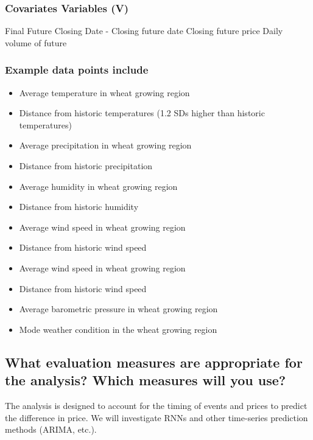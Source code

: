 \documentclass[twoside,11pt]{article}
\begin{document}
\subsubsection{Covariates Variables (V)}

Final Future Closing Date - Closing future date
Closing future price
Daily volume of future

\subsubsection{Example data points include}
\begin{itemize}
  \item Average temperature in wheat growing region 
  \item Distance from historic temperatures (1.2 SDs higher than historic temperatures)
  \\
  \item Average precipitation in wheat growing region
  \item Distance from historic precipitation
  \\
  \item Average humidity in wheat growing region
  \item Distance from historic humidity
  \\
  \item Average wind speed in wheat growing region
  \item Distance from historic wind speed
  \\
  \item Average wind speed in wheat growing region
  \item Distance from historic wind speed
  \\
  \item Average barometric pressure in wheat growing region
  \item Mode weather condition in the wheat growing region
\end{itemize}


\subsection{What evaluation measures are appropriate for the analysis? Which measures will you use?}

The analysis is designed to account for the timing of events and prices to predict the difference in price. We will investigate RNNs and other time-series prediction methods (ARIMA, etc.). 
\end{document}
